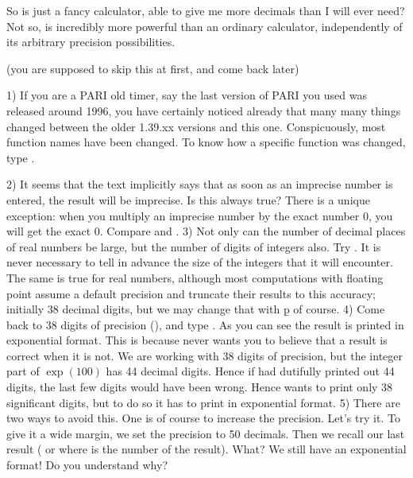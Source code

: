 So  is just a fancy calculator, able to give me more decimals than I
will ever need? Not so,  is incredibly more powerful than an ordinary
calculator, independently of its arbitrary precision possibilities.

 (you are supposed to skip this at first,
and come back later)

1) If you are a PARI old timer, say the last version of PARI you used was
released around 1996, you have certainly noticed already that many many
things changed between the older 1.39.xx versions and this one.
Conspicuously, most function names have been changed. To know how a specific
function was changed, type .

2) It seems that the text implicitly says that as soon as an imprecise number
is entered, the result will be imprecise. Is this always true? There is a
unique exception: when you multiply an imprecise number by the exact number
0, you will get the exact 0. Compare  and .
\smallskip
%
3) Not only can the number of decimal places of real numbers be large, but
the number of digits of integers also. Try . It is never necessary
to tell  in advance the size of the integers that it will encounter.
The same is true for real numbers, although most computations with floating
point assume a default precision and truncate their results to this accuracy;
initially 38 decimal digits, but we may change that with \b{p} of course.
\smallskip
%
4) Come back to 38 digits of precision (), and type
. As you can see the result is printed in exponential format.
This is because  never wants you to believe that a result is correct
when it is not. We are working with 38 digits of precision, but the integer
part of $\exp(100)$ has 44 decimal digits. Hence if  had dutifully
printed out 44 digits, the last few digits would have been wrong. Hence
 wants to print only 38 significant digits, but to do so it has to
print in exponential format. \smallskip
%
5) There are two ways to avoid this. One is of course to increase the
precision. Let's try it. To give it a wide margin, we set the precision to 50
decimals. Then we recall our last result (\kbd{\%}
or  where  is the number of the result). What? We still have
an exponential format! Do you understand why?

